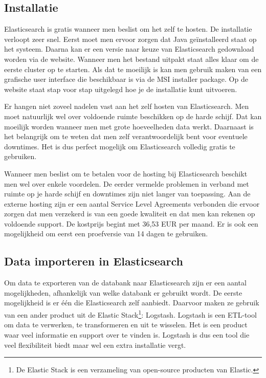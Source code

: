 \subsection{Installatie}
\label{Installatie}

Elasticsearch is gratis wanneer men beslist om het zelf te hosten. De installatie verloopt zeer snel. Eerst moet men ervoor zorgen dat Java geïnstalleerd staat op het systeem. Daarna kan er een versie naar keuze van Elasticsearch gedownload worden via de website. Wanneer men het bestand uitpakt staat alles klaar om de eerste cluster op te starten. Als dat te moeilijk is kan men gebruik maken van een grafische user interface die beschikbaar is via de MSI installer package. Op de website staat stap voor stap uitgelegd hoe je de installatie kunt uitvoeren. 

Er hangen niet zoveel nadelen vast aan het zelf hosten van Elasticsearch. Men moet natuurlijk wel over voldoende ruimte beschikken op de harde schijf. Dat kan moeilijk worden wanneer men met grote hoeveelheden data werkt. Daarnaast is het belangrijk om te weten dat men zelf verantwoordelijk bent voor eventuele downtimes. Het is dus perfect mogelijk om Elasticsearch volledig gratis te gebruiken. 

Wanneer men beslist om te betalen voor de hosting bij Elasticsearch beschikt men wel over enkele voordelen. De eerder vermelde problemen in verband met ruimte op je harde schijf en downtimes zijn niet langer van toepassing. Aan de externe hosting zijn er een aantal Service Level Agreements verbonden die ervoor zorgen dat men verzekerd is van een goede kwaliteit en dat men kan rekenen op voldoende support. De kostprijs begint met 36,53 EUR per maand. Er is ook een mogelijkheid om eerst een proefversie van 14 dagen te gebruiken.

\subsection{Data importeren in Elasticsearch}

Om data te exporteren van de databank naar Elasticsearch zijn er een aantal mogelijkheden, afhankelijk van welke databank er gebruikt wordt. De eerste mogelijkheid is er één die Elasticsearch zelf aanbiedt. Daarvoor maken ze gebruik van een ander product uit de Elastic Stack\footnote{De Elastic Stack is een verzameling van open-source producten van Elastic.}: Logstash. Logstash is een ETL-tool om data te verwerken, te transformeren en uit te wisselen. Het is een product waar veel informatie en support over te vinden is. Logstash is dus een tool die veel flexibiliteit biedt maar wel een extra installatie vergt. 

